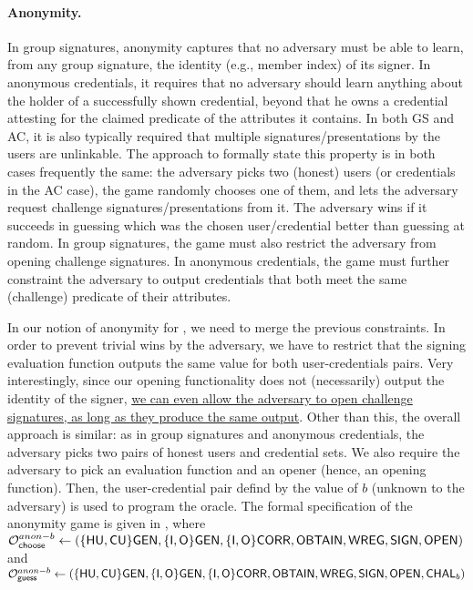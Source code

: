 \paragraph{Anonymity.} %
In group signatures, anonymity captures that no adversary must be able to learn,
from any group signature, the identity (e.g., member index) of its signer. In 
anonymous credentials, it requires that no adversary should learn anything about
the holder of a successfully shown credential, beyond that he owns a credential
attesting for the claimed predicate of the attributes it contains. In both GS
and AC, it is also typically required that
multiple signatures/presentations by the users are unlinkable. The approach to
formally state this property is in both cases frequently the same: the adversary
picks two (honest) users (or credentials in the AC case), the game randomly
chooses one of them, and lets the adversary request challenge
signatures/presentations from it. The adversary wins if it succeeds in guessing
which was the chosen user/credential better than guessing at random. In group
signatures, the game must also restrict the adversary from opening challenge
signatures. In anonymous credentials, the game must further constraint the
adversary to output credentials that both meet the same (challenge) predicate
of their attributes.

In our notion of anonymity for \UAS, we need to merge the previous constraints.
In order to prevent trivial wins by the adversary, we have to restrict that the
signing evaluation function outputs the same value for both user-credentials
pairs. Very interestingly, since our opening functionality does not
(necessarily) output the identity of the signer, \uline{we can even allow the
  adversary to open challenge signatures, as long as they produce the same
  output}. Other than this, the overall approach is similar: as
in group signatures and anonymous credentials, the adversary picks two pairs of
honest users and credential sets. We also require the adversary to pick an
evaluation function and an opener (hence, an opening function). Then, the
user-credential pair defind by the value of $b$ (unknown to the adversary) is
used to program the \CHALb oracle. The formal specification of the anonymity
game is given in , where $\mathcal{O}^{anon-b}_{\mathsf{choose}} \gets (\lbrace\mathsf{HU},
\mathsf{CU}\rbrace\mathsf{GEN},\lbrace\mathsf{I},\mathsf{O}\rbrace\mathsf{GEN},\lbrace\mathsf{I},\mathsf{O}\rbrace\mathsf{CORR},\mathsf{OBTAIN},
\mathsf{WREG},\mathsf{SIGN},\mathsf{OPEN})$ and $\mathcal{O}^{anon-b}_{\mathsf{guess}} \gets (\lbrace\mathsf{HU},\mathsf{CU}\rbrace\mathsf{GEN},\lbrace\mathsf{I},
\mathsf{O}\rbrace\mathsf{GEN},\lbrace\mathsf{I},\mathsf{O}\rbrace\mathsf{CORR},\mathsf{OBTAIN},\mathsf{WREG},\mathsf{SIGN},\mathsf{OPEN},\mathsf{CHAL}_b)$

